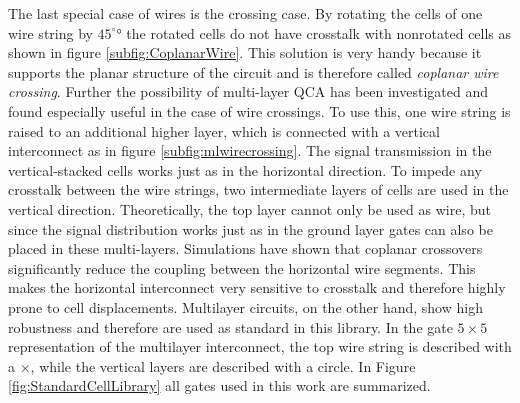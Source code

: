 The last special case of wires is the crossing case. By rotating the cells of one wire string by $45^{\circ}°$ the rotated cells do not have crosstalk with nonrotated cells \cite{Inverter_displacements} as shown in figure \ref{subfig:CoplanarWire}. This solution is very handy because it supports the planar structure of the circuit and is therefore called \textit{coplanar wire crossing}. Further the possibility of multi-layer QCA has been investigated \cite{multi_lyer_wire_crossing} and found especially useful in the case of wire crossings. To use this, one wire string is raised to an additional higher layer, which is connected with a vertical interconnect as in figure \ref{subfig:mlwirecrossing}. The signal transmission in the vertical-stacked cells works just as in the horizontal direction. To impede any crosstalk between the wire strings, two intermediate layers of cells are used in the vertical direction. Theoretically, the top layer cannot only be used as wire, but since the signal distribution works just as in the ground layer gates can also be placed in these multi-layers. Simulations have shown that coplanar crossovers significantly reduce the coupling between the horizontal wire segments. This makes the horizontal interconnect very sensitive to crosstalk and therefore highly prone to cell displacements. Multilayer circuits, on the other hand, show high robustness and therefore are used as standard in this library. In the gate $5 \times 5$ representation of the multilayer interconnect, the top wire string is described with a $\times$, while the vertical layers are described with a circle. In Figure \ref{fig:StandardCellLibrary} all gates used in this work are summarized.

